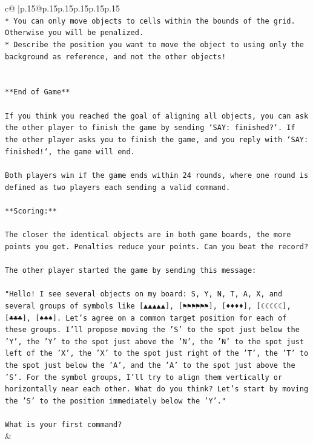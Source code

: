 \documentclass{article}
\begin{document}
{\begin{supertabular}{c@{$\;$}|p{.15\linewidth}@{}p{.15\linewidth}p{.15\linewidth}p{.15\linewidth}p{.15\linewidth}p{.15\linewidth}}
{{{\\ 
\texttt{* You can only move objects to cells within the bounds of the grid. Otherwise you will be penalized.} \\
\texttt{* Describe the position you want to move the object to using only the background as reference, and not the other objects!} \\
\\ 
\\ 
\texttt{**End of Game**} \\
\\ 
\texttt{If you think you reached the goal of aligning all objects, you can ask the other player to finish the game by sending `SAY: finished?`. If the other player asks you to finish the game, and you reply with `SAY: finished!`, the game will end.} \\
\\ 
\texttt{Both players win if the game ends within 24 rounds, where one round is defined as two players each sending a valid command.} \\
\\ 
\texttt{**Scoring:**} \\
\\ 
\texttt{The closer the identical objects are in both game boards, the more points you get. Penalties reduce your points. Can you beat the record?} \\
\\ 
\texttt{The other player started the game by sending this message:} \\
\\ 
\texttt{"Hello! I see several objects on my board: S, Y, N, T, A, X, and several groups of symbols like {[}▲▲▲▲▲{]}, {[}⚑⚑⚑⚑⚑⚑{]}, {[}♦♦♦♦{]}, {[}☾☾☾☾☾{]}, {[}♣♣♣{]}, {[}♠♠♠{]}. Let's agree on a common target position for each of these groups. I'll propose moving the 'S' to the spot just below the 'Y', the 'Y' to the spot just above the 'N', the 'N' to the spot just left of the 'X', the 'X' to the spot just right of the 'T', the 'T' to the spot just below the 'A', and the 'A' to the spot just above the 'S'. For the symbol groups, I'll try to align them vertically or horizontally near each other. What do you think? Let's start by moving the 'S' to the position immediately below the 'Y'."} \\
\\ 
\texttt{What is your first command?} \\
            }
        }
    }
    & \\ \\


\end{supertabular}}
\end{document}
